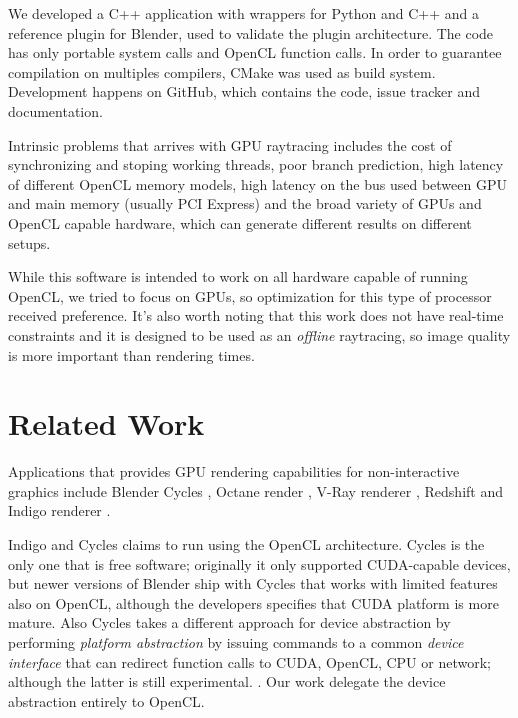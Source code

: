 \documentclass[a4paper]{sbgames}               %
\begin{document}
We developed a C++ application with wrappers for
Python %
and C++ and a reference plugin for Blender, used to validate the
plugin architecture. The code has only portable system calls and
OpenCL function calls. In order to guarantee compilation on multiples
compilers, CMake was used as build system. Development happens on
GitHub, which contains the code, issue tracker and
documentation\cite{RenderGirl}.

Intrinsic problems that arrives with GPU raytracing includes the cost
of synchronizing and stoping working threads, poor branch prediction,
high latency of different OpenCL memory models, high latency on the
bus used between GPU and main memory (usually PCI Express) and the
broad variety of GPUs and OpenCL capable hardware, which can generate
different results on different setups.

While this software is intended to work on all hardware capable of
running OpenCL, we tried to focus on GPUs, so optimization for this
type of processor received preference. It's also worth noting that
this work does not have real-time constraints and it is designed to be
used as an \emph{offline} raytracing, so image quality is more
important than rendering times.

\section{Related Work}
\label{sec:related-work}

Applications that provides GPU rendering capabilities for
non-interactive graphics include Blender Cycles\cite{Cycles} , Octane
render \cite{Octane}, V-Ray renderer \cite{VRAY}, Redshift
\cite{Redshift} and Indigo renderer \cite{Indigo}.

Indigo and Cycles claims to run using the OpenCL architecture. Cycles
is the only one that is free software; originally it only supported
CUDA-capable devices, but newer versions of Blender ship with Cycles
that works with limited features also on OpenCL, although the
developers specifies that CUDA platform is more mature.\cite{Cycles}
Also Cycles takes a different approach for device abstraction by
performing \emph{platform abstraction} by issuing commands to a common
\emph{device interface} that can redirect function calls to CUDA,
OpenCL, CPU or network; although the latter is still
experimental. \cite{CyclesDevel}. Our work delegate the device
abstraction entirely to OpenCL.
\end{document}
